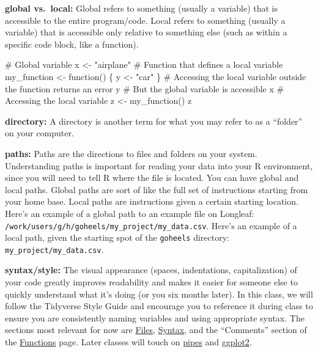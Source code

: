 \documentclass[
  letterpaper,
  DIV=11,
  numbers=noendperiod]{scrreprt}
\newenvironment{Shaded}{\begin{snugshade}}{\end{snugshade}}
\newcommand{\CommentTok}[1]{\textcolor[rgb]{0.37,0.37,0.37}{#1}}
\newcommand{\ControlFlowTok}[1]{\textcolor[rgb]{0.00,0.23,0.31}{#1}}
\newcommand{\FunctionTok}[1]{\textcolor[rgb]{0.28,0.35,0.67}{#1}}
\newcommand{\NormalTok}[1]{\textcolor[rgb]{0.00,0.23,0.31}{#1}}
\newcommand{\OtherTok}[1]{\textcolor[rgb]{0.00,0.23,0.31}{#1}}
\newcommand{\StringTok}[1]{\textcolor[rgb]{0.13,0.47,0.30}{#1}}
\begin{document}
\textbf{global vs.~local:} Global refers to something (usually a
variable) that is accessible to the entire program/code. Local refers to
something (usually a variable) that is accessible only relative to
something else (such as within a specific code block, like a function).

\begin{Shaded}
\begin{Highlighting}[]
\CommentTok{\# Global variable}
\NormalTok{x }\OtherTok{\textless{}{-}} \StringTok{"airplane"}
\CommentTok{\# Function that defines a local variable}
\NormalTok{my\_function }\OtherTok{\textless{}{-}} \ControlFlowTok{function}\NormalTok{() \{}
\NormalTok{    y }\OtherTok{\textless{}{-}} \StringTok{"car"}
\NormalTok{\}}
\CommentTok{\# Accessing the local variable outside the function returns an error}
\NormalTok{y}
\CommentTok{\# But the global variable is accessible}
\NormalTok{x}
\CommentTok{\# Accessing the local variable }
\NormalTok{z }\OtherTok{\textless{}{-}} \FunctionTok{my\_function}\NormalTok{()}
\NormalTok{z}
\end{Highlighting}
\end{Shaded}

\textbf{directory:} A directory is another term for what you may refer
to as a ``folder'' on your computer.

\textbf{paths:} Paths are the directions to files and folders on your
system. Understanding paths is important for reading your data into your
R environment, since you will need to tell R where the file is located.
You can have global and local paths. Global paths are sort of like the
full set of instructions starting from your home base. Local paths are
instructions given a certain starting location. Here's an example of a
global path to an example file on Longleaf:
\texttt{/work/users/g/h/goheels/my\_project/my\_data.csv}. Here's an
example of a local path, given the starting spot of the \texttt{goheels}
directory: \texttt{my\_project/my\_data.csv}.

\textbf{syntax/style:} The visual appearance (spaces, indentations,
capitalization) of your code greatly improves readability and makes it
easier for someone else to quickly understand what it's doing (or you
six months later). In this class, we will follow the Tidyverse Style
Guide and encourage you to reference it during class to ensure you are
consistently naming variables and using appropriate syntax. The sections
most relevant for now are
\href{https://style.tidyverse.org/files.html}{Files},
\href{https://style.tidyverse.org/files.html}{Syntax}, and the
``Comments'' section of the
\href{https://style.tidyverse.org/functions.html\#comments-1}{Functions}
page. Later classes will touch on
\href{https://style.tidyverse.org/pipes.html}{pipes} and
\href{https://style.tidyverse.org/ggplot2.html}{ggplot2}.
\end{document}
